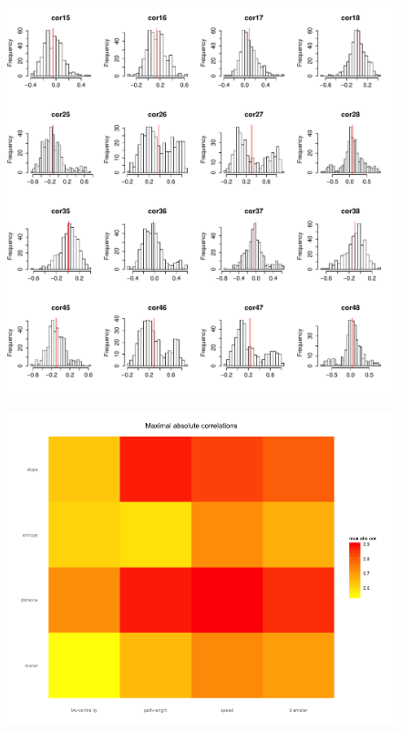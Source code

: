\documentclass{bmcart}
\begin{document}
\begin{figure}[h!]
\begin{minipage}{0.55\linewidth}
\includegraphics[width=\textwidth]{figures/hist_crossCorMat_breaks30}
\end{minipage}
\begin{minipage}{0.34\linewidth}
\includegraphics[width=\textwidth]{figures/heatmap_maxAbsCor}\\

\end{minipage}
\end{figure}
\end{document}
